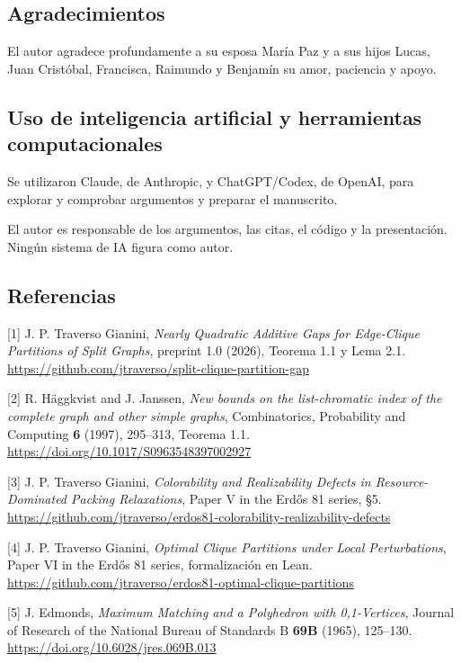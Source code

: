 \documentclass[spanish,11pt,a4paper]{article}
\begin{document}
\subsection{Agradecimientos}\label{agradecimientos}

El autor agradece profundamente a su esposa María Paz y a sus hijos Lucas, Juan Cristóbal, Francisca, Raimundo y Benjamín su amor, paciencia y apoyo.

\subsection{Uso de inteligencia artificial y herramientas computacionales}\label{uso-de-inteligencia-artificial-y-herramientas-computacionales}

Se utilizaron Claude, de Anthropic, y ChatGPT/Codex, de OpenAI, para explorar y comprobar argumentos y preparar el manuscrito.

El autor es responsable de los argumentos, las citas, el código y la presentación. Ningún sistema de IA figura como autor.

\subsection{Referencias}\label{referencias}

{[}1{]} J. P. Traverso Gianini, \emph{Nearly Quadratic Additive Gaps for Edge-Clique Partitions of Split Graphs}, preprint 1.0 (2026), Teorema 1.1 y Lema 2.1. \url{https://github.com/jtraverso/split-clique-partition-gap}

{[}2{]} R. Häggkvist and J. Janssen, \emph{New bounds on the list-chromatic index of the complete graph and other simple graphs}, Combinatorics, Probability and Computing \textbf{6} (1997), 295--313, Teorema 1.1. \url{https://doi.org/10.1017/S0963548397002927}

{[}3{]} J. P. Traverso Gianini, \emph{Colorability and Realizability Defects in Resource-Dominated Packing Relaxations}, Paper V in the Erdős 81 series, §5. \url{https://github.com/jtraverso/erdos81-colorability-realizability-defects}

{[}4{]} J. P. Traverso Gianini, \emph{Optimal Clique Partitions under Local Perturbations}, Paper VI in the Erdős 81 series, formalización en Lean. \url{https://github.com/jtraverso/erdos81-optimal-clique-partitions}

{[}5{]} J. Edmonds, \emph{Maximum Matching and a Polyhedron with 0,1-Vertices}, Journal of Research of the National Bureau of Standards B \textbf{69B} (1965), 125--130. \url{https://doi.org/10.6028/jres.069B.013}
\end{document}
